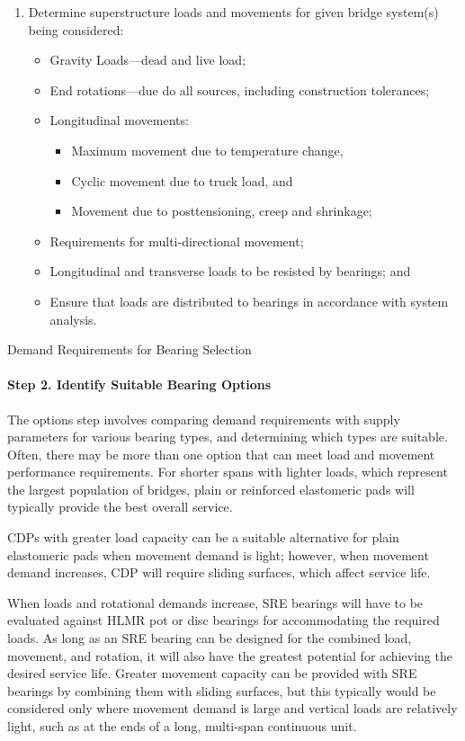 \begin{enumerate}[label=步骤 1.\arabic*,itemindent=4em]
  \item Determine superstructure loads and movements for given bridge system(s) being considered:
  \begin{itemize}
    \item Gravity Loads—dead and live load;
    \item End rotations—due do all sources, including construction tolerances;
    \item Longitudinal movements:
    \begin{itemize}
      \item Maximum movement due to temperature change,
      \item Cyclic movement due to truck load, and
      \item Movement due to posttensioning, creep and shrinkage;
    \end{itemize}
    \item Requirements for multi-directional movement;
    \item Longitudinal and transverse loads to be resisted by bearings; and
    \item Ensure that loads are distributed to bearings in accordance with system analysis.
  \end{itemize}
\end{enumerate}

\begin{table}
  \caption{Demand Requirements for Bearing Selection}
  \label{tab:requirements-bearing-selection}
\end{table}


\paragraph*{Step 2. Identify Suitable Bearing Options}
The options step involves comparing demand requirements with supply parameters for various bearing types,
and determining which types are suitable. Often, there may be more than one option that can meet load and
movement performance requirements. For shorter spans with lighter loads, which represent the largest population
of bridges, plain or reinforced elastomeric pads will typically provide the best overall service.

CDPs with greater load capacity can be a suitable alternative for plain elastomeric pads when movement
demand is light; however, when movement demand increases, CDP will require sliding surfaces, which affect
service life.

When loads and rotational demands increase, SRE bearings will have to be evaluated against HLMR pot or
disc bearings for accommodating the required loads. As long as an SRE bearing can be designed for the combined
load, movement, and rotation, it will also have the greatest potential for achieving the desired service life. Greater
movement capacity can be provided with SRE bearings by combining them with sliding surfaces, but this
typically would be considered only where movement demand is large and vertical loads are relatively light, such
as at the ends of a long, multi-span continuous unit.

